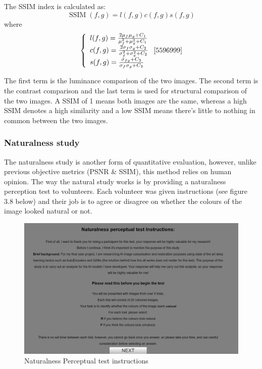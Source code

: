 The SSIM index is calculated as:
\begin{equation}
\operatorname{SSIM}(f, g)=l(f, g) c(f, g) s(f, g)
\end{equation}
where
\begin{equation}
\left\{\begin{array}{l}
l(f, g)=\frac{2 \mu_{f} \mu_{g}+C_{1}}{\mu_{f}^{2}+\mu_{g}^{2}+C_{1}} \\
c(f, g)=\frac{2 \sigma_{f} \sigma_{g}+C_{2}}{\sigma_{f}^{2}+\sigma_{g}^{2}+C_{2}} \\
s(f, g)=\frac{\sigma_{f g}+C_{3}}{\sigma_{f} \sigma_{g}+C_{3}}
\end{array}\right.
\cite{5596999}
\end{equation}

The first term is the luminance comparison of the two images. The second term is the contrast comparison and the last term is used for structural comparison of the two images. A SSIM of 1 means both images are the same, whereas a high SSIM denotes a high similarity and a low SSIM means there's little to nothing in common between the two images. 



\pagebreak
\subsubsection*{Naturalness study}
The naturalness study is another form of quantitative evaluation, however, unlike previous objective metrics (PSNR & SSIM), this method relies on human opinion. The way the natural study works is by providing a naturalness perception test to volunteers. Each volunteer was given instructions (see figure 3.8 below) and their job is to agree or disagree on whether the colours of the image looked natural or not.

\begin{figure}[H]
    \centering
    \includegraphics[width=0.8\columnwidth]{sections/figures/naturalness_study_instructions.JPG}
    \caption{Naturalness Perceptual test instructions}
    \label{fig:my_label}
\end{figure}




